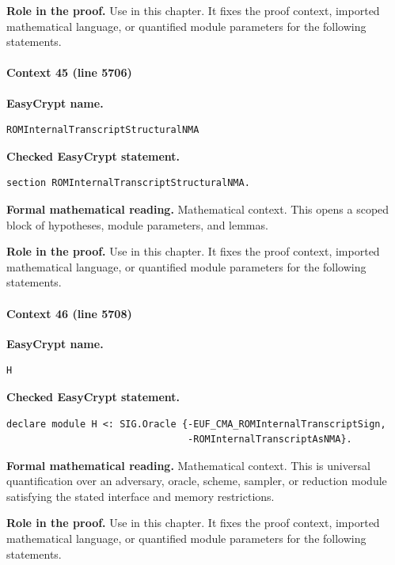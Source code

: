 \noindent\textbf{Role in the proof.}
Use in this chapter. It fixes the proof context, imported mathematical language, or quantified module parameters for the following statements.

\paragraph{Context 45 (line 5706)}
\noindent\textbf{EasyCrypt name.}
\begin{lstlisting}[language=EasyCrypt,basicstyle=\ttfamily\scriptsize]
ROMInternalTranscriptStructuralNMA
\end{lstlisting}
\noindent\textbf{Checked EasyCrypt statement.}
\begin{lstlisting}[language=EasyCrypt,basicstyle=\ttfamily\scriptsize]
section ROMInternalTranscriptStructuralNMA.
\end{lstlisting}
\noindent\textbf{Formal mathematical reading.}
Mathematical context. This opens a scoped block of hypotheses, module parameters, and lemmas.

\noindent\textbf{Role in the proof.}
Use in this chapter. It fixes the proof context, imported mathematical language, or quantified module parameters for the following statements.

\paragraph{Context 46 (line 5708)}
\noindent\textbf{EasyCrypt name.}
\begin{lstlisting}[language=EasyCrypt,basicstyle=\ttfamily\scriptsize]
H
\end{lstlisting}
\noindent\textbf{Checked EasyCrypt statement.}
\begin{lstlisting}[language=EasyCrypt,basicstyle=\ttfamily\scriptsize]
declare module H <: SIG.Oracle {-EUF_CMA_ROMInternalTranscriptSign,
                                -ROMInternalTranscriptAsNMA}.
\end{lstlisting}
\noindent\textbf{Formal mathematical reading.}
Mathematical context. This is universal quantification over an adversary, oracle, scheme, sampler, or reduction module satisfying the stated interface and memory restrictions.

\noindent\textbf{Role in the proof.}
Use in this chapter. It fixes the proof context, imported mathematical language, or quantified module parameters for the following statements.

